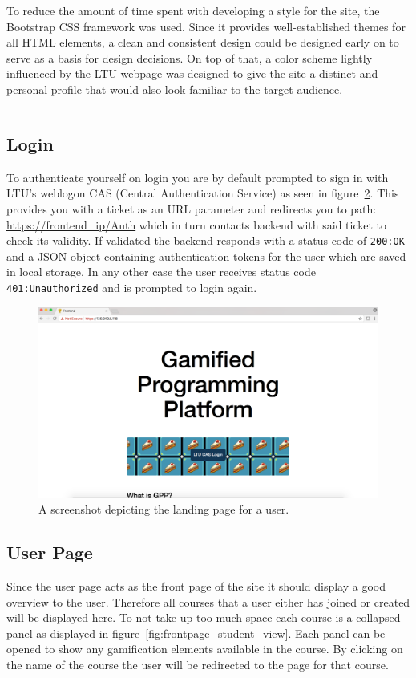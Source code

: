 To reduce the amount of time spent with developing a style for the site, the Bootstrap CSS framework was used. Since it provides well-established themes for all HTML elements, a clean and consistent design could be designed early on to serve as a basis for design decisions. On top of that, a color scheme lightly influenced by the LTU webpage was designed to give the site a distinct and personal profile that would also look familiar to the target audience.

\begin{figure}[hb]
    \centering
    \begin{tabular}{r|l}
        
    \end{tabular}
    \label{tab:components}
\end{figure}

\subsection{Login}
To authenticate yourself on login you are by default prompted to sign in with LTU's weblogon CAS (Central Authentication Service) as seen in figure~\ref{fig:login}.
This provides you with a ticket as an URL parameter and redirects you to path: \url{https://frontend\_ip/Auth} which in turn contacts backend with said ticket to check its validity. If validated the backend responds with a status code of \texttt{200:\@ OK} and a JSON object containing authentication tokens for the user which are saved in local storage. In any other case the user receives status code \texttt{401:\@ Unauthorized} and is prompted to login again.
\begin{figure}[H]
    \centering
    \includegraphics[width=.45\textwidth]{img/gppinpictures/login2.png}
    \caption{A screenshot depicting the landing page for a user.}
    \label{fig:login}
\end{figure}

\subsection{User Page}
Since the user page acts as the front page of the site it should display a good overview to the user. Therefore all courses that a user either has joined or created will be displayed here. To not take up too much space each course is a collapsed panel as displayed in figure~\ref{fig:frontpage_student_view}. Each panel can be opened to show any gamification elements available in the course. By clicking on the name of the course the user will be redirected to the page for that course.

